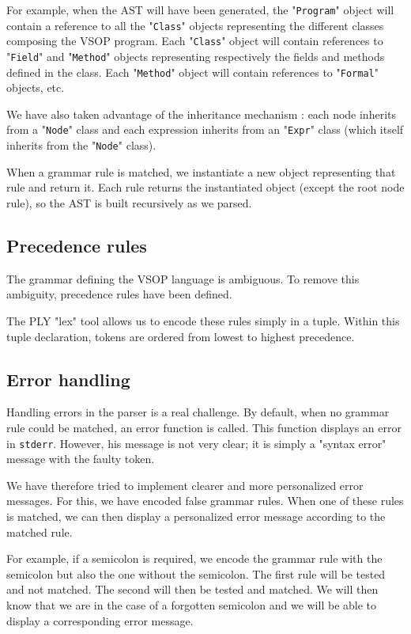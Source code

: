 \documentclass[a4paper, 12pt]{article}
\begin{document}
    For example, when the AST will have been generated, the "\texttt{Program}" object will contain a reference to all the "\texttt{Class}" objects representing the different classes composing the VSOP program. Each "\texttt{Class}" object will contain references to "\texttt{Field}" and "\texttt{Method}" objects representing respectively the fields and methods defined in the class. Each "\texttt{Method}" object will contain references to "\texttt{Formal}" objects, etc.
    
    We have also taken advantage of the inheritance mechanism : each node inherits from a "\texttt{Node}" class and each expression inherits from an "\texttt{Expr}" class (which itself inherits from the "\texttt{Node}" class).
    
    When a grammar rule is matched, we instantiate a new object representing that rule and return it. Each rule returns the instantiated object (except the root node rule), so the AST is built recursively as we parsed.
    
    \subsection{Precedence rules}
    
    The grammar defining the VSOP language is ambiguous. To remove this ambiguity, precedence rules have been defined.
    
    The PLY "lex" tool allows us to encode these rules simply in a tuple. Within this tuple declaration, tokens are ordered from lowest to highest precedence.
    
    \subsection{Error handling}
    
    Handling errors in the parser is a real challenge. By default, when no grammar rule could be matched, an error function is called. This function displays an error in \texttt{stderr}. However, his message is not very clear; it is simply a "syntax error" message with the faulty token.
    
    We have therefore tried to implement clearer and more personalized error messages. For this, we have encoded false grammar rules. When one of these rules is matched, we can then display a personalized error message according to the matched rule.
    
    For example, if a semicolon is required, we encode the grammar rule with the semicolon but also the one without the semicolon. The first rule will be tested and not matched. The second will then be tested and matched. We will then know that we are in the case of a forgotten semicolon and we will be able to display a corresponding error message.
    
\end{document}
